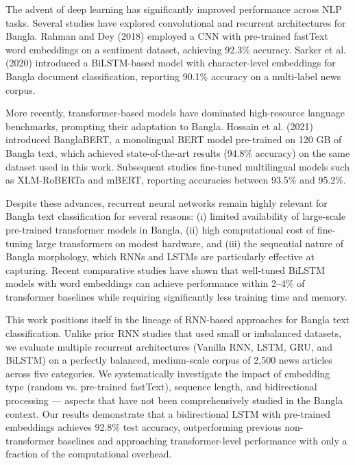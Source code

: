 \documentclass[pdflatex,sn-mathphys-num]{sn-jnl}
\theoremstyle{thmstyleone}\newtheorem{theorem}{Theorem}
\theoremstyle{thmstyletwo}\newtheorem{example}{Example}\newtheorem{remark}{Remark}
\theoremstyle{thmstylethree}\newtheorem{definition}{Definition}
\begin{document}
The advent of deep learning has significantly improved performance across NLP tasks. Several studies have explored convolutional and recurrent architectures for Bangla. Rahman and Dey (2018) \cite{rahman2018} employed a CNN with pre-trained fastText word embeddings \cite{bojanowski2017enriching} on a sentiment dataset, achieving 92.3\% accuracy. Sarker et al. (2020) \cite{sarker2020} introduced a BiLSTM-based model with character-level embeddings for Bangla document classification, reporting 90.1\% accuracy on a multi-label news corpus.

More recently, transformer-based models have dominated high-resource language benchmarks, prompting their adaptation to Bangla. Hossain et al. (2021) \cite{hossain2021banglabert} introduced BanglaBERT, a monolingual BERT model pre-trained on 120 GB of Bangla text, which achieved state-of-the-art results (94.8\% accuracy) on the same dataset used in this work. Subsequent studies \cite{bhattacharjee2022, alam2023} fine-tuned multilingual models such as XLM-RoBERTa \cite{conneau2020unsupervised} and mBERT, reporting accuracies between 93.5\% and 95.2\%.

Despite these advances, recurrent neural networks remain highly relevant for Bangla text classification for several reasons: (i) limited availability of large-scale pre-trained transformer models in Bangla, (ii) high computational cost of fine-tuning large transformers on modest hardware, and (iii) the sequential nature of Bangla morphology, which RNNs and LSTMs are particularly effective at capturing. Recent comparative studies \cite{ahmad2022, das2023} have shown that well-tuned BiLSTM models with word embeddings can achieve performance within 2–4\% of transformer baselines while requiring significantly less training time and memory.

This work positions itself in the lineage of RNN-based approaches for Bangla text classification. Unlike prior RNN studies that used small or imbalanced datasets, we evaluate multiple recurrent architectures (Vanilla RNN, LSTM, GRU, and BiLSTM) on a perfectly balanced, medium-scale corpus of 2,500 news articles across five categories. We systematically investigate the impact of embedding type (random vs. pre-trained fastText), sequence length, and bidirectional processing — aspects that have not been comprehensively studied in the Bangla context. Our results demonstrate that a bidirectional LSTM with pre-trained embeddings achieves 92.8\% test accuracy, outperforming previous non-transformer baselines and approaching transformer-level performance with only a fraction of the computational overhead.
\end{document}
